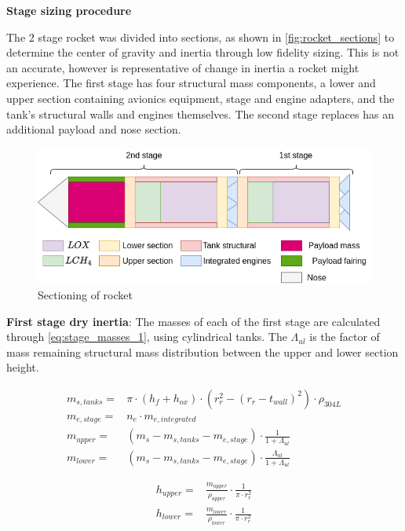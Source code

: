 \textbf{Stage sizing procedure}

The 2 stage rocket was divided into sections, as shown in \autoref{fig:rocket_sections} to determine the center of gravity and inertia through low fidelity sizing. This is not an accurate, however is representative of change in inertia a rocket might experience. The first stage has four structural mass components, a lower and upper section containing avionics equipment, stage and engine adapters, and the tank's structural walls and engines themselves. The second stage replaces has an additional payload and nose section.

\begin{figure}[H]
    \centering
    \includegraphics[width=0.95\linewidth]{figures/LiteratureStudy/RocketDiagram_new_new.png}
    \caption{Sectioning of rocket}
    \label{fig:rocket_sections}
\end{figure}

\textbf{First stage dry inertia}: The masses of each of the first stage are calculated through \autoref{eq:stage_masses_1}, using cylindrical tanks. The $\Lambda_{ul}$ is the factor of mass remaining structural mass distribution between the upper and lower section height.

\begin{equation}
\begin{aligned}
    m_{s,tanks} =& \pi \cdot (h_f + h_{ox}) \cdot (r_r^2 - (r_r - t_{wall})^2) \cdot \rho_{304L} \\
    m_{e,stage} =& n_e \cdot m_{e,integrated} \\
    m_{upper} =& (m_s - m_{s,tanks} - m_{e,stage}) \cdot \frac{1}{1 + \Lambda_{ul}} \\
    m_{lower} =& (m_s - m_{s,tanks} - m_{e,stage}) \cdot \frac{\Lambda_{ul}}{1+\Lambda_{ul}}
\end{aligned}
\label{eq:stage_masses_1}
\end{equation}

\begin{equation}
\begin{aligned}
    h_{upper} =& \frac{m_{upper}}{\rho_{upper}} \cdot \frac{1}{\pi \cdot r_r^2} \\
    h_{lower} =& \frac{m_{lower}}{\rho_{lower}} \cdot \frac{1}{\pi \cdot r_r^2} \\
\end{aligned}
\label{eq:section_heights}
\end{equation}


